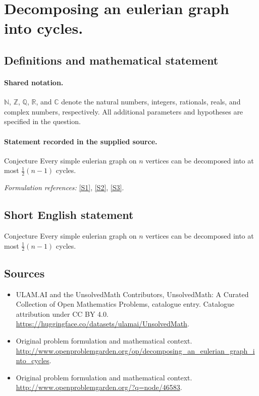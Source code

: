 \documentclass[11pt]{article}
\newcommand{\sref}[2]{\hyperlink{source:#1:#2}{[S#2]}}
\begin{document}
\section{Decomposing an eulerian graph into cycles.}\label{statement}

\subsection{Definitions and mathematical statement}

\paragraph{Shared notation.}$\mathbb N$, $\mathbb Z$, $\mathbb Q$, $\mathbb R$, and $\mathbb C$ denote the natural numbers, integers, rationals, reals, and complex numbers, respectively. All additional parameters and hypotheses are specified in the question.


\paragraph{Statement recorded in the supplied source.}
Conjecture Every simple eulerian graph on $n$ vertices can be decomposed into at most $\frac{1}{2}(n-1)$ cycles.
\par\smallskip\textit{Formulation references:} \sref{statement}{1}, \sref{statement}{2}, \sref{statement}{3}.
\subsection{Short English statement}
Conjecture Every simple eulerian graph on $n$ vertices can be decomposed into at most $\frac{1}{2}(n-1)$ cycles.
\subsection{Sources}
\begin{itemize}
\item[\hypertarget{source:statement:1}{S1}] ULAM.AI and the UnsolvedMath Contributors, UnsolvedMath: A Curated Collection of Open Mathematics Problems, catalogue entry. Catalogue attribution under CC BY 4.0.
\url{https://huggingface.co/datasets/ulamai/UnsolvedMath}.
\item[\hypertarget{source:statement:2}{S2}] Original problem formulation and mathematical context.
\url{http://www.openproblemgarden.org/op/decomposing_an_eulerian_graph_into_cycles}.
\item[\hypertarget{source:statement:3}{S3}] Original problem formulation and mathematical context.
\url{http://www.openproblemgarden.org/?q=node/46583}.
\end{itemize}
\label{end:statement}
\end{document}
